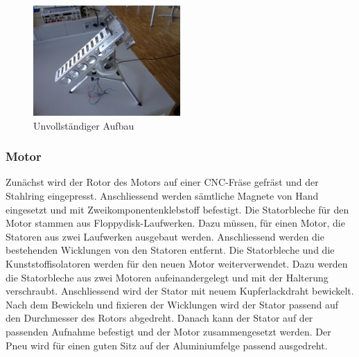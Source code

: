 \begin{figure}[h!]
	\centering
	\includegraphics[width=0.5\textwidth]{fig/IMG_2303.JPG}
	\caption{Unvollständiger Aufbau}
	\label{fig:Unvollständiger Aufbau}
\end{figure}
\FloatBarrier

\subsubsection{Motor}
Zunächst wird der Rotor des Motors auf einer CNC-Fräse gefräst und der 
Stahlring eingepresst. Anschliessend werden sämtliche Magnete von Hand 
eingesetzt und mit Zweikomponentenklebstoff befestigt. Die Statorbleche für 
den Motor stammen aus Floppydisk-Laufwerken. Dazu müssen, für einen Motor, die 
Statoren aus zwei Laufwerken ausgebaut werden. Anschliessend werden die 
bestehenden Wicklungen von den Statoren entfernt. Die Statorbleche und die 
Kunststoffisolatoren werden für den neuen Motor weiterverwendet. Dazu werden 
die Statorbleche aus zwei Motoren aufeinandergelegt und mit der Halterung 
verschraubt. Anschliessend wird der Stator mit neuem Kupferlackdraht 
bewickelt. Nach dem Bewickeln und fixieren der Wicklungen wird der Stator 
passend auf den Durchmesser des Rotors abgedreht. Danach kann der Stator auf 
der passenden Aufnahme befestigt und der Motor zusammengesetzt werden. Der 
Pneu wird für einen guten Sitz auf der Aluminiumfelge passend ausgedreht. 
